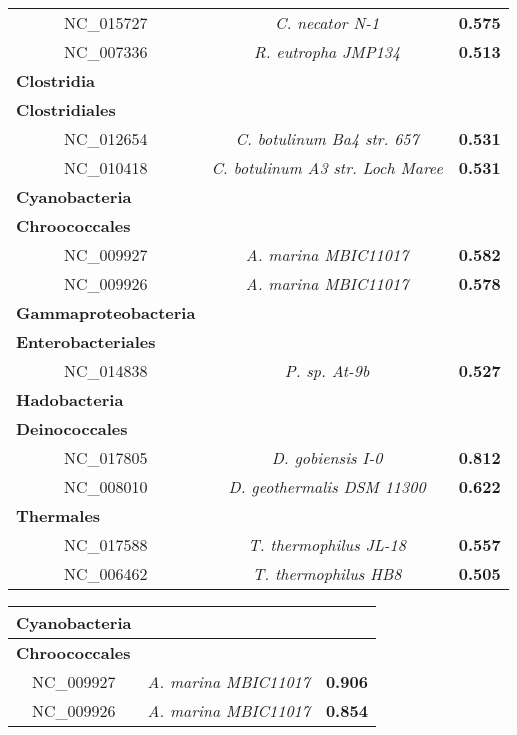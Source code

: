 \begin{landscape}
\begin{table}
\begin{minipage}[t]{0.4\textwidth}
\begin{tiny}
\begin{tabular}{c>{\itshape}c>{\bfseries}c}
NC\_015727&C. necator N-1&0.575\\
NC\_007336&R. eutropha JMP134&0.513\\
\multicolumn{1}{l}{\textbf{Clostridia}}\\
\hline
\multicolumn{1}{l}{\textbf{Clostridiales}}\\
NC\_012654&C. botulinum Ba4 str. 657&0.531\\
NC\_010418&C. botulinum A3 str. Loch Maree&0.531\\
\multicolumn{1}{l}{\textbf{Cyanobacteria}}\\
\hline
\multicolumn{1}{l}{\textbf{Chroococcales}}\\
NC\_009927&A. marina MBIC11017&0.582\\
NC\_009926&A. marina MBIC11017&0.578\\
\multicolumn{1}{l}{\textbf{Gammaproteobacteria}}\\
\hline
\multicolumn{1}{l}{\textbf{Enterobacteriales}}\\
NC\_014838&P. sp. At-9b&0.527\\
\multicolumn{1}{l}{\textbf{Hadobacteria}}\\
\hline
\multicolumn{1}{l}{\textbf{Deinococcales}}\\
NC\_017805&D. gobiensis I-0&0.812\\
NC\_008010&D. geothermalis DSM 11300&0.622\\
\multicolumn{1}{l}{\textbf{Thermales}}\\
NC\_017588&T. thermophilus JL-18&0.557\\
NC\_006462&T. thermophilus HB8&0.505\\
\end{tabular}
	  \end{tiny}
	  \label{tabclassifrece1}
	  \end{minipage}
	  \hspace{2cm}
	 \begin{minipage}[t]{0.5\textwidth}
	 	  \centering
	 	  \vspace{-3.5cm}
	  	 \begin{tiny}
	  \begin{tabular}{c>{\itshape}c>{\bfseries}c}
	 \multicolumn{1}{l}{\textbf{Cyanobacteria}}\\
\hline
\multicolumn{1}{l}{\textbf{Chroococcales}}\\
NC\_009927&A. marina MBIC11017&0.906\\
NC\_009926&A. marina MBIC11017&0.854\\

\end{tabular}
\end{tiny}
\end{minipage}
\end{table}
\end{landscape}
